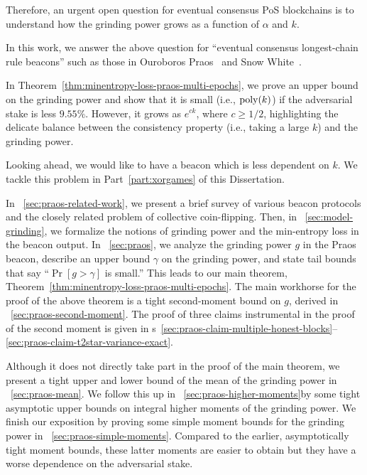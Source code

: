 Therefore, an urgent open question for eventual consensus PoS blockchains is to understand 
how the grinding power grows as a function of $\alpha$ and $k$. 


In this work, we answer the above question for ``eventual consensus longest-chain rule beacons'' such as those in 
Ouroboros Praos~\cite{Praos} and Snow White~\cite{SnowWhite}. 


In Theorem~\ref{thm:minentropy-loss-praos-multi-epochs}, 
we prove an upper bound on the grinding power 
and show that it is small (i.e., $\mathrm{poly}(k)$) if the adversarial stake is less $9.55\%$.
However, it grows as $e^{ck}$, where $c \geq 1/2$, 
highlighting the delicate balance between the consistency property 
(i.e., taking a large $k$) 
and the grinding power.

Looking ahead, we would like to have a beacon which is less dependent on $k$. 
We tackle this problem in Part~\ref{part:xorgames} of this Dissertation.



In \Section~\ref{sec:praos-related-work}, 
we present a brief survey of various beacon protocols 
and the closely related problem of collective coin-flipping. 
Then, in \Section~\ref{sec:model-grinding}, 
we formalize the notions of grinding power and the min-entropy loss in the beacon output. 
In \Section~\ref{sec:praos}, 
we analyze the grinding power $g$ in the Praos beacon, 
describe an upper bound $\gamma$ on the grinding power, 
and state tail bounds that say ``$\Pr[g > \gamma]$ is small.'' 
This leads to our main theorem, Theorem~\ref{thm:minentropy-loss-praos-multi-epochs}.
The main workhorse for the proof of the above theorem is 
a tight second-moment bound on $g$, derived in \Section~\ref{sec:praos-second-moment}. 
The proof of three claims instrumental in the proof of the second moment 
is given in {\Section}s~\ref{sec:praos-claim-multiple-honest-blocks}--\ref{sec:praos-claim-t2star-variance-exact}.

Although it does not directly take part in the proof of the main theorem, 
we present a tight upper and lower bound of the mean of the grinding power 
in \Section~\ref{sec:praos-mean}. 
We follow this up in \Section~\ref{sec:praos-higher-moments}by some tight asymptotic upper bounds on 
integral higher moments of the grinding power. 
We finish our exposition by proving some simple moment bounds for the grinding power 
in \Section~\ref{sec:praos-simple-moments}. 
Compared to the earlier, asymptotically tight moment bounds, 
these latter moments are easier to obtain but 
they have a worse dependence on the adversarial stake.

